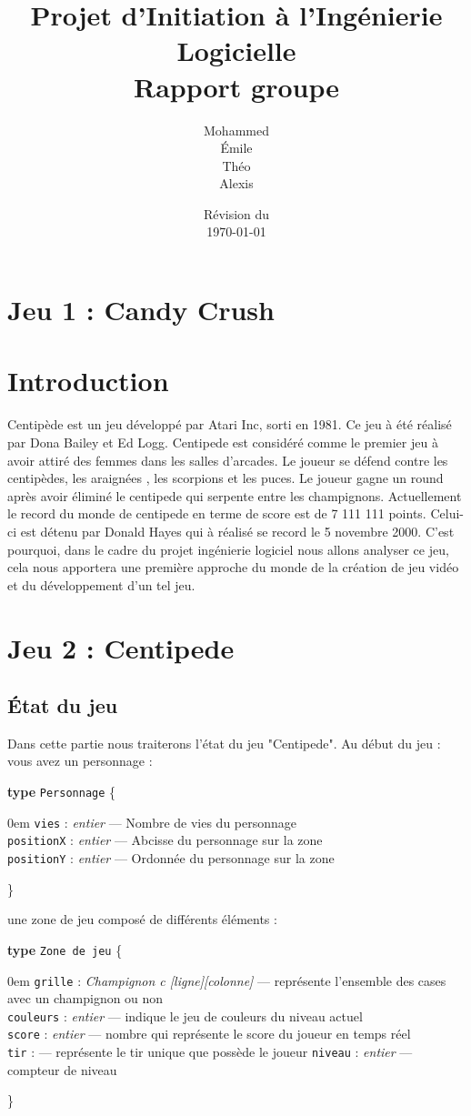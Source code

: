 \documentclass[a4paper, 12pt, twoside]{article}
\title{Projet d'Initiation à l'Ingénierie Logicielle\\Rapport groupe \no 3}
\author{Mohammed \bsc{Lakal}\\Émile \bsc{Jeannin}\\Théo \bsc{Mottet}\\Alexis \bsc{Cabodi}}
\date{Révision du\\\today}
\newenvironment{typeag}[1][]{\noindent \textbf{type} \texttt{#1} \{\begin{addmargin}[2em]{0em}}{\end{addmargin}\}}
\newcommand{\variable}[3]{\noindent \texttt{#1} : \textit{#2} --- #3}
\begin{document}
\maketitle
\newpage
\tableofcontents
\newpage
\section{Jeu 1 : Candy Crush}
\section{Introduction}

Centipède est un jeu développé par Atari Inc, sorti en 1981. Ce jeu à été réalisé par Dona Bailey et Ed Logg. Centipede est considéré comme le premier jeu à avoir attiré des femmes dans les salles d'arcades. 
Le joueur se défend contre les centipèdes, les araignées , les scorpions et les puces. Le joueur gagne un round après avoir éliminé le centipede qui serpente entre les champignons. Actuellement le record du monde de centipede en terme de score est de 7 111 111 points. Celui-ci est détenu par Donald Hayes qui à réalisé se record le 5 novembre 2000. 
C'est pourquoi, dans le cadre du projet ingénierie logiciel nous allons analyser ce jeu, cela nous apportera une première approche du monde de la création de jeu vidéo et du développement d'un tel jeu. 
\section{Jeu 2 : Centipede}
\subsection{État du jeu}

Dans cette partie nous traiterons l'état du jeu "Centipede". Au début du jeu : 
vous avez un personnage : 

\begin{typeag}[Personnage]
        \variable{vies}{entier}{Nombre de vies du personnage}\\
        \variable{positionX}{entier}{Abcisse du personnage sur la zone}\\
        \variable{positionY}{entier}{Ordonnée du personnage sur la zone}
\end{typeag}

une zone de jeu composé de différents éléments : 

\begin{typeag}[Zone de jeu]
        \variable{grille}{Champignon c [ligne][colonne]}{représente l'ensemble des cases avec un champignon ou non}\\
        \variable{couleurs}{entier}{indique le jeu de couleurs du niveau actuel}\\
        \variable{score}{entier}{nombre qui représente le score du joueur en temps réel}\\
        \variable{tir}{}{représente le tir unique que possède le joueur}
        \variable{niveau}{entier}{compteur de niveau}
\end{typeag}
\end{document}
